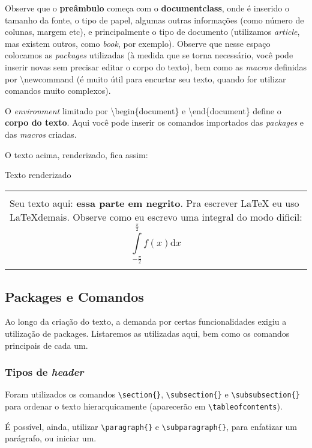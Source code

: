 \documentclass[12pt,a4paper]{article}
\newcommand{\dd}{\mathrm{d}}
\newenvironment{caixa}[1]
    {\begin{center}
    #1\\[1ex]
    \begin{tabular}{|p{0.9\textwidth}|}
    \hline\\
    }
    { 
    \\\\\hline
    \end{tabular} 
    \end{center}
    }
\begin{document}
Observe que o \textbf{preâmbulo} começa com o \textbf{documentclass}, onde é inserido o tamanho da fonte, o tipo de papel, algumas outras informações (como  número de colunas, margem etc), e principalmente o tipo de documento (utilizamos \textit{article}, mas existem outros, como \textit{book}, por exemplo). Observe que nesse espaço colocamos as \textit{packages} utilizadas (à medida que se torna necessário, você pode inserir novas sem precisar editar o corpo do texto), bem como as \textit{macros} definidas por \textbackslash newcommand (é muito útil para encurtar seu texto, quando for utilizar comandos muito complexos).

O \textit{environment} limitado por \textbackslash begin\{document\} e \textbackslash end\{document\} define o \textbf{corpo do texto}. Aqui você pode inserir os comandos importados das \textit{packages} e das \textit{macros} criadas.



O texto acima, renderizado, fica assim:

\begin{caixa}{Texto renderizado}
Seu texto aqui: \textbf{essa parte em negrito}. Pra escrever LaTeX eu uso \LaTeX demais. Observe como eu escrevo uma integral do modo dificil:
$$\displaystyle\int\limits_{-\frac{\pi}{2}}^{\frac{\pi}{2}} f(x) \dd x$$
\end{caixa}

\newpage
\subsection{Packages e Comandos}

Ao longo da criação do texto, a demanda por certas funcionalidades exigiu a utilização de packages. Listaremos as utilizadas aqui, bem como os comandos principais de cada um.

\subsubsection{Tipos de \textit{header}}

Foram utilizados os comandos \texttt{\textbackslash section\{\}}, \texttt{\textbackslash subsection\{\}} e \texttt{\textbackslash subsubsection\{\}} para ordenar o texto hierarquicamente (aparecerão em \texttt{\textbackslash tableofcontents}).

É possível, ainda, utilizar \texttt{\textbackslash paragraph\{\}} e \texttt{\textbackslash subparagraph\{\}}, para enfatizar um parágrafo, ou iniciar um.
\end{document}
